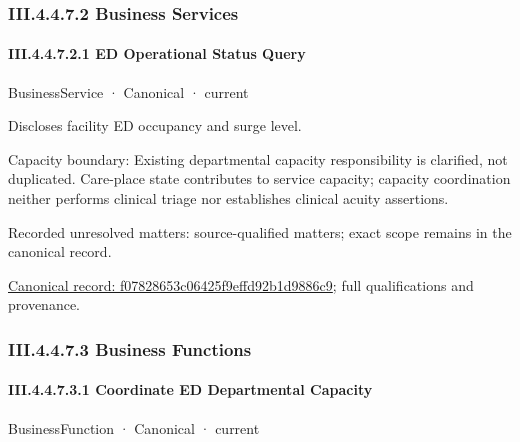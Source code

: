 \subsubsection*{III.4.4.7.2 Business Services}
\label{navigation:III.4.4.7.2}

\paragraph*{III.4.4.7.2.1 ED Operational Status Query}
\label{navigation:III.4.4.7.2.1}

\label{element:f07828653c06425f9effd92b1d9886c9}
{\small BusinessService · Canonical · current}\par

Discloses facility ED occupancy and surge level.



Capacity boundary: Existing departmental capacity responsibility is clarified, not duplicated. Care-place state contributes to service capacity; capacity coordination neither performs clinical triage nor establishes clinical acuity assertions.


{\small Recorded unresolved matters: source-qualified matters; exact scope remains in the canonical record.}\par
{\footnotesize \href{../../../../../../../continuum/business/business-service/f07828653c06425f9effd92b1d9886c9.md}{Canonical record: f07828653c06425f9effd92b1d9886c9}; full qualifications and provenance.}\par
\subsubsection*{III.4.4.7.3 Business Functions}
\label{navigation:III.4.4.7.3}

\paragraph*{III.4.4.7.3.1 Coordinate ED Departmental Capacity}
\label{navigation:III.4.4.7.3.1}

\label{element:a1559e7ed12c4f249128fba2ff74d536}
{\small BusinessFunction · Canonical · current}\par

